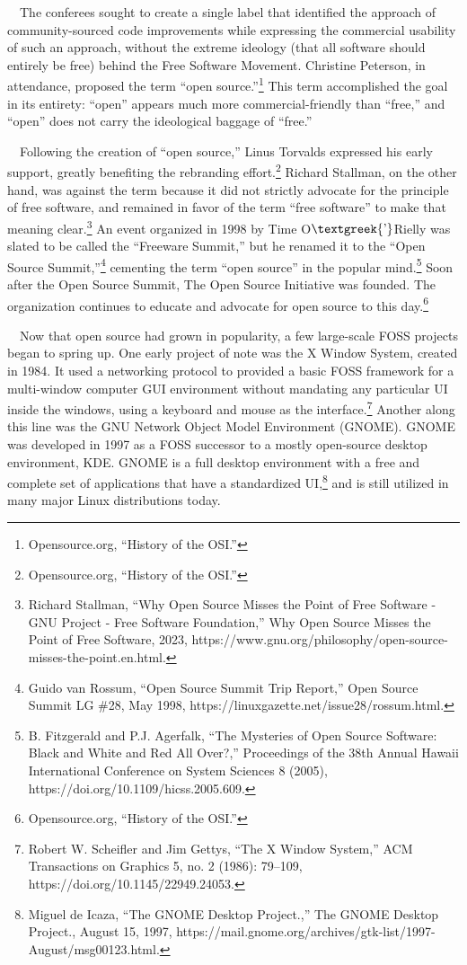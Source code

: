 \documentclass{article}
\begin{document}
\ \ The conferees sought to create a single label that identified the approach of community-sourced code improvements
while expressing the commercial usability of such an approach, without the extreme ideology (that all software should
entirely be free) behind the Free Software Movement. Christine Peterson, in attendance, proposed the term “open
source.”\footnote{Opensource.org, “History of the OSI.”} This term accomplished the goal in its entirety: “open”
appears much more commercial-friendly than “free,” and “open” does not carry the ideological baggage of “free.”

\ \ Following the creation of “open source,” Linus Torvalds expressed his early support, greatly benefiting the
rebranding effort.\footnote{Opensource.org, “History of the OSI.”} Richard Stallman, on the other hand, was against the
term because it did not strictly advocate for the principle of free software, and remained in favor of the term “free
software” to make that meaning clear.\footnote{Richard Stallman, “Why Open Source Misses the Point of Free Software -
GNU Project - Free Software Foundation,” Why Open Source Misses the Point of Free Software, 2023,
https://www.gnu.org/philosophy/open-source-misses-the-point.en.html.} An event organized in 1998 by Time
O$\text{\textgreek{’}}$Rielly was slated to be called the “Freeware Summit,” but he renamed it to the “Open Source
Summit,”\footnote{Guido van Rossum, “Open Source Summit Trip Report,” Open Source Summit LG \#28, May 1998,
https://linuxgazette.net/issue28/rossum.html.} cementing the term “open source” in the popular mind.\footnote{B.
Fitzgerald and P.J. Agerfalk, “The Mysteries of Open Source Software: Black and White and Red All Over?,” Proceedings
of the 38th Annual Hawaii International Conference on System Sciences 8 (2005),
https://doi.org/10.1109/hicss.2005.609.} Soon after the Open Source Summit, The Open Source Initiative was founded. The
organization continues to educate and advocate for open source to this day.\footnote{Opensource.org, “History of the
OSI.”}

\ \ Now that open source had grown in popularity, a few large-scale FOSS projects began to spring up. One early project
of note was the X Window System, created in 1984. It used a networking protocol to provided a basic FOSS framework for
a multi-window computer GUI environment without mandating any particular UI inside the windows, using a keyboard and
mouse as the interface.\footnote{Robert W. Scheifler and Jim Gettys, “The X Window System,” ACM Transactions on
Graphics 5, no. 2 (1986): 79–109, https://doi.org/10.1145/22949.24053.} Another along this line was the GNU Network
Object Model Environment (GNOME). GNOME was developed in 1997 as a FOSS successor to a mostly open-source desktop
environment, KDE. GNOME is a full desktop environment with a free and complete set of applications that have a
standardized UI,\footnote{Miguel de Icaza, “The GNOME Desktop Project.,” The GNOME Desktop Project., August 15, 1997,
https://mail.gnome.org/archives/gtk-list/1997-August/msg00123.html.} and is still utilized in many major Linux
distributions today.
\end{document}
